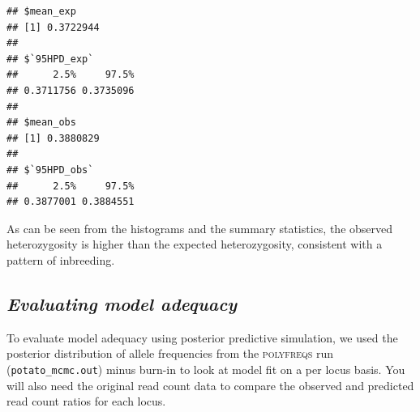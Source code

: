 \documentclass[]{article}
\newenvironment{Shaded}{\begin{snugshade}}{\end{snugshade}}
\newcommand{\KeywordTok}[1]{\textcolor[rgb]{0.13,0.29,0.53}{\textbf{{#1}}}}
\newcommand{\FloatTok}[1]{\textcolor[rgb]{0.00,0.00,0.81}{{#1}}}
\newcommand{\StringTok}[1]{\textcolor[rgb]{0.31,0.60,0.02}{{#1}}}
\newcommand{\CommentTok}[1]{\textcolor[rgb]{0.56,0.35,0.01}{\textit{{#1}}}}
\newcommand{\NormalTok}[1]{{#1}}
\begin{document}
\begin{Shaded}
\end{Shaded}

\begin{verbatim}
## $mean_exp
## [1] 0.3722944
## 
## $`95HPD_exp`
##      2.5%     97.5% 
## 0.3711756 0.3735096 
## 
## $mean_obs
## [1] 0.3880829
## 
## $`95HPD_obs`
##      2.5%     97.5% 
## 0.3877001 0.3884551
\end{verbatim}

As can be seen from the histograms and the summary statistics, the
observed heterozygosity is higher than the expected heterozygosity,
consistent with a pattern of inbreeding.

\subsection{\texorpdfstring{\emph{Evaluating model
adequacy}}{Evaluating model adequacy}}\label{evaluating-model-adequacy}

To evaluate model adequacy using posterior predictive simulation, we
used the posterior distribution of allele frequencies from the
\textsc{polyfreqs} run (\texttt{potato\_mcmc.out}) minus burn-in to look
at model fit on a per locus basis. You will also need the original read
count data to compare the observed and predicted read count ratios for
each locus.
\end{document}

